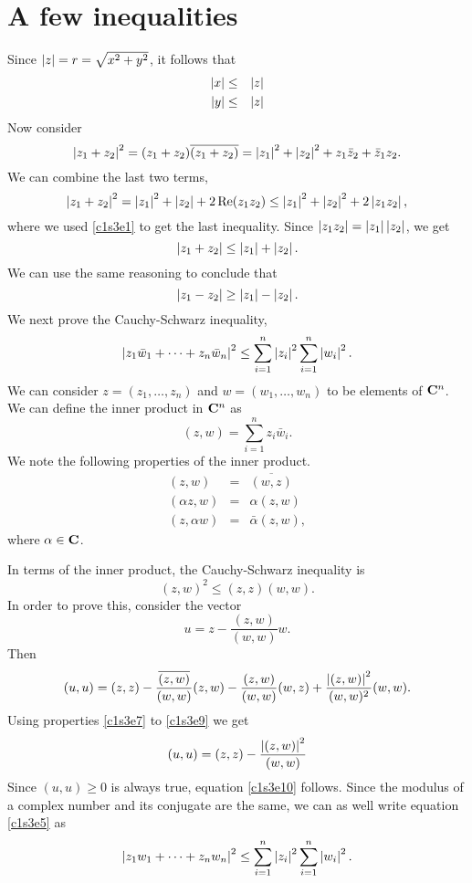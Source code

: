 \section{A few inequalities}\label{c1s3}
Since $\left\vert{z}\right\vert = r = \sqrt{x^2 + y^2}$, it follows that
\begin{eqnarray}
\left\vert{x}\right\vert &\le& \left\vert{z}\right\vert \label{c1s3e1} \\
\left\vert{y}\right\vert &\le& \left\vert{z}\right\vert \label{c1s3e2}
\end{eqnarray}
Now consider
\[
\left\vert{z_1 + z_2}\right\vert^2 = (z_1 + z_2)\overline{(z_1 + z_2)} = \left\vert{z_1}\right\vert^2 + \left\vert{z_2}\right\vert^2
 + z_1\bar{z}_2 + \bar{z}_1z_2.
\]
We can combine the last two terms,
\[
\left\vert{z_1 + z_2}\right\vert^2 = \left\vert{z_1}\right\vert^2 + \left\vert{z_2}\right\vert + 2\operatorname{Re}(z_1z_2) \le 
\left\vert{z_1}\right\vert^2 + \left\vert{z_2}\right\vert^2 + 2\left\vert{z_1z_2}\right\vert,
\] 
where we used \eqref{c1s3e1} to get the last inequality. Since $\left\vert{z_1z_2}\right\vert
= \left\vert{z_1}\right\vert\left\vert{z_2}\right\vert$, we get 
\begin{equation}\label{c1s3e3}
\left\vert{z_1 + z_2}\right\vert \le \left\vert{z_1}\right\vert + \left\vert{z_2}\right\vert.
\end{equation}
We can use the same reasoning to conclude that
\begin{equation}\label{c1s3e4}
\left\vert{z_1 - z_2}\right\vert \ge \left\vert{z_1}\right\vert - \left\vert{z_2}\right\vert.
\end{equation}
We next prove the Cauchy-Schwarz inequality,
\begin{equation}\label{c1s3e5}
\left\vert{z_1\bar{w}_1 + \cdots + z_n\bar{w}_n}\right\vert^2 \le \sum_{i=1}^n\left\vert{z_i}\right\vert^2
\sum_{i=1}^n\left\vert{w_i}\right\vert^2.
\end{equation}
We can consider $z = (z_1, \ldots, z_n)$ and $w = (w_1, \ldots, w_n)$ to be 
elements of $\mathbf{C}^n$. We can define the inner product in $\mathbf{C}^n$ as
\begin{equation}\label{c1s3e6}
(z, w) = \sum_{i=1}^n z_i\bar{w}_i.
\end{equation}
We note the following properties of the inner product.
\begin{eqnarray}
(z, w) &=& \overline{(w, z)} \label{c1s3e7} \\
(\alpha z, w) &=& \alpha(z, w) \label{c1s3e8} \\
(z, \alpha w) &=& \bar{\alpha}(z, w), \label{c1s3e9}
\end{eqnarray} 
where $\alpha \in \mathbf{C}$. 

In terms of the inner product, the Cauchy-Schwarz inequality is
\begin{equation}\label{c1s3e10}
(z, w)^2 \le (z, z)(w, w).
\end{equation}
In order to prove this, consider the vector
\[
u = z - \frac{(z, w)}{(w, w)}w.
\]
Then
\[
(u, u) = (z, z) - \frac{\overline{(z, w)}}{(w, w)}(z, w) - 
\frac{(z, w)}{(w, w)}(w, z) + \frac{\left\vert{(z, w)}\right\vert^2}{(w, w)^2}(w, w).
\]
Using properties \eqref{c1s3e7} to \eqref{c1s3e9} we get
\[
(u, u) = (z, z) - \frac{\left\vert{(z, w)}\right\vert^2}{(w, w)}
\]
Since $(u, u) \ge 0$ is always true, equation \eqref{c1s3e10} follows. Since
the modulus of a complex number and its conjugate are the same, we can as well
write equation \eqref{c1s3e5} as
\begin{equation}\label{c1s3e11}
\left\vert{z_1w_1 + \cdots + z_nw_n}\right\vert^2 \le \sum_{i=1}^n\left\vert{z_i}\right\vert^2
\sum_{i=1}^n\left\vert{w_i}\right\vert^2.
\end{equation}

